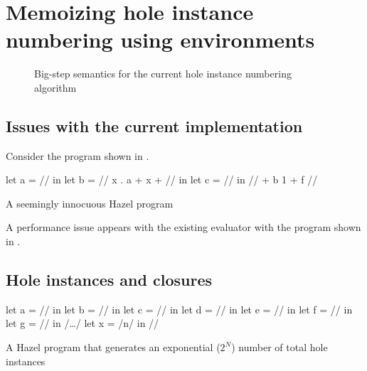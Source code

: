 \section{Memoizing hole instance numbering using environments}
\label{sec:renumbering}

\begin{figure}
  \centering
  \begin{mdframed}
    \begin{singlespace}
      
    \end{singlespace}
  \end{mdframed}
  \caption{Big-step semantics for the current hole instance numbering algorithm}
  \label{fig:small-step-formal}
\end{figure}

\subsection{Issues with the current implementation}
\label{sec:current_problems}

Consider the program shown in .

\begin{listing}
  \centering
  \begin{hminted}
let a = // in
let b = /\lbd/ x . { a + x + // } in
let c = // in
// + b 1 + f //
  \end{hminted}
  \caption{A seemingly innocuous Hazel program}
  \label{fig:sample_hazel_program}
\end{listing}

A performance issue appears with the existing evaluator with the program shown in .



\subsection{Hole instances and closures}
\label{sec:hole_instances_and_closures}

\begin{listing}
  \centering
  \begin{hminted}
let a = // in
let b = // in
let c = // in
let d = // in
let e = // in
let f = // in
let g = // in
/\dots/
let x = /\heh n/ in
//
  \end{hminted}
  \caption{A Hazel program that generates an exponential ($2^N$) number of total hole instances}
  \label{fig:hole_renumbering_problem}
\end{listing}

